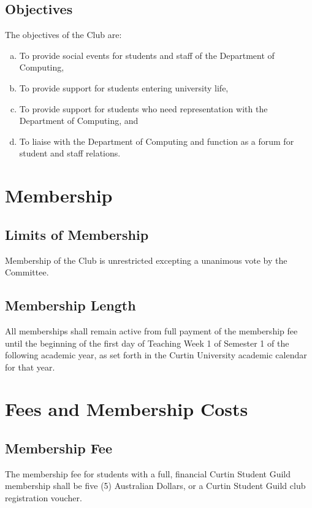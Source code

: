 \documentclass[a4paper,12pt]{article}
\begin{document}
\subsection{Objectives}

The objectives of the Club are:

\begin{enumerate}[a)]
	\item To provide social events for students and staff of the Department of Computing,
	\item To provide support for students entering university life,
	\item To provide support for students who need representation with the Department of Computing, and
	\item To liaise with the Department of Computing and function as a forum for student and staff relations.
\end{enumerate}

\section{Membership}

\subsection{Limits of Membership}

Membership of the Club is unrestricted excepting a unanimous vote by the Committee.

\subsection{Membership Length}

All memberships shall remain active from full payment of the membership fee until the beginning of the first day of Teaching Week 1 of Semester 1 of the following academic year, as set forth in the Curtin University academic calendar for that year.

\section{Fees and Membership Costs}

\subsection{Membership Fee}

The membership fee for students with a full, financial Curtin Student Guild membership shall be five (5) Australian Dollars, or a Curtin Student Guild club registration voucher.
\end{document}
